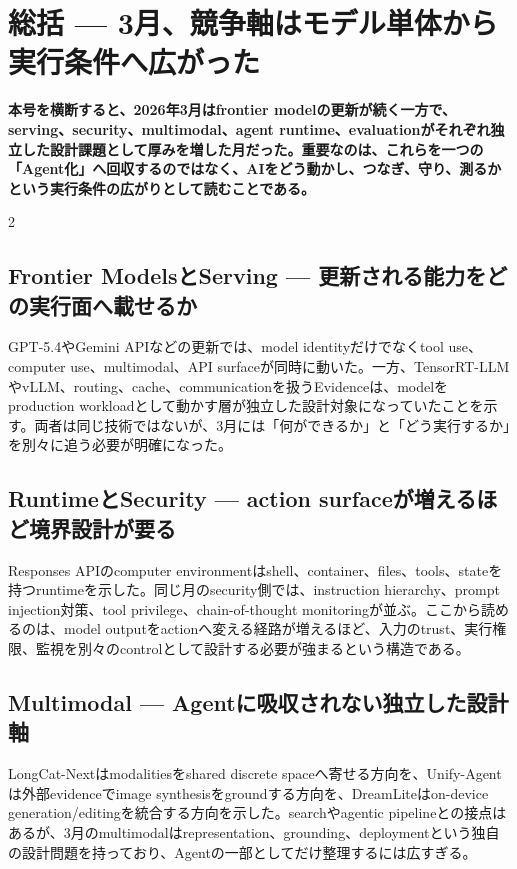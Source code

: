 \section{総括 — 3月、競争軸はモデル単体から実行条件へ広がった}
\label{sec:retrospective-synthesis}
\noindent\textbf{本号を横断すると、2026年3月はfrontier modelの更新が続く一方で、serving、security、multimodal、agent runtime、evaluationがそれぞれ独立した設計課題として厚みを増した月だった。重要なのは、これらを一つの「Agent化」へ回収するのではなく、AIをどう動かし、つなぎ、守り、測るかという実行条件の広がりとして読むことである。}
\medskip
\begin{multicols}{2}
\par\medskip{}
\subsection{Frontier ModelsとServing — 更新される能力をどの実行面へ載せるか}
GPT-5.4やGemini APIなどの更新では、model identityだけでなくtool use、computer use、multimodal、API surfaceが同時に動いた。一方、TensorRT-LLMやvLLM、routing、cache、communicationを扱うEvidenceは、modelをproduction workloadとして動かす層が独立した設計対象になっていたことを示す。両者は同じ技術ではないが、3月には「何ができるか」と「どう実行するか」を別々に追う必要が明確になった。 \cite{src-eea6230f612a,src-a24fd97eb3d0,src-7e670bf82538,src-d6cda62f02bb}

\par\medskip{}
\subsection{RuntimeとSecurity — action surfaceが増えるほど境界設計が要る}
Responses APIのcomputer environmentはshell、container、files、tools、stateを持つruntimeを示した。同じ月のsecurity側では、instruction hierarchy、prompt injection対策、tool privilege、chain-of-thought monitoringが並ぶ。ここから読めるのは、model outputをactionへ変える経路が増えるほど、入力のtrust、実行権限、監視を別々のcontrolとして設計する必要が強まるという構造である。 \cite{src-01572b4c34e9,src-18b7ee4fe5e4,src-3dec299964e6,src-5becf449a527}

\par\medskip{}
\subsection{Multimodal — Agentに吸収されない独立した設計軸}
LongCat-Nextはmodalitiesをshared discrete spaceへ寄せる方向を、Unify-Agentは外部evidenceでimage synthesisをgroundする方向を、DreamLiteはon-device generation/editingを統合する方向を示した。searchやagentic pipelineとの接点はあるが、3月のmultimodalはrepresentation、grounding、deploymentという独自の設計問題を持っており、Agentの一部としてだけ整理するには広すぎる。 \cite{src-ac36472a8f09,src-197775677c0d,src-b8369fd2c988}


\end{multicols}
